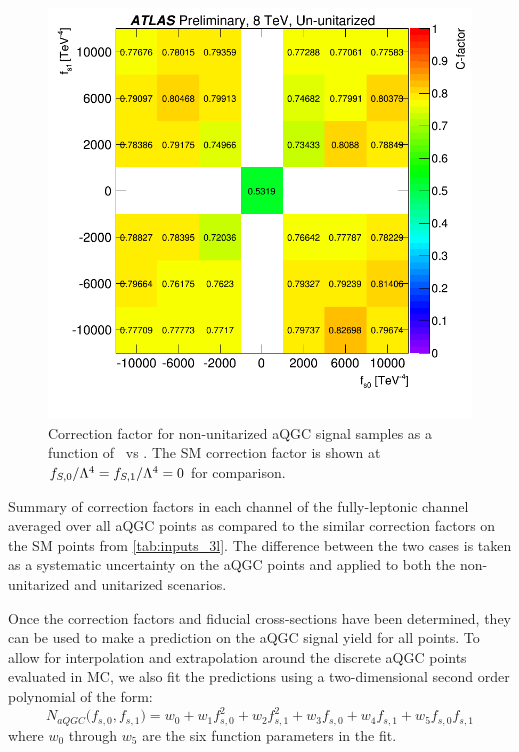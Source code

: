 \begin{figure}[htb]
\centering
\includegraphics[width=.8\textwidth]{figures/aQGC/cfactor_chargesum.png}
\caption{Correction factor for non-unitarized aQGC signal samples as a function of \fszero~vs \fsone.
The SM correction factor is shown at $f_{S,0}/\Lambda^4=f_{S,1}/\Lambda^4=0$ for comparison.}
\label{fig:aqgc_cfactor_3l}
\end{figure}


\begin{table}[htb]
\centering

\caption{Summary of correction factors in each channel of the fully-leptonic channel 
averaged over all aQGC points as compared to the similar correction factors on the SM 
points from \tab\ref{tab:inputs_3l}. The difference between the two cases
is taken as a systematic uncertainty on the aQGC points and applied to both the 
non-unitarized and unitarized scenarios.}
\label{tab:aqgc_cfactor_3l_summary}
\end{table}

Once the correction factors and fiducial cross-sections have been determined,
they can be used to make a prediction on the aQGC signal yield 
for all points.  To allow for interpolation and extrapolation
around the discrete aQGC points evaluated in MC, we also 
fit the predictions using a two-dimensional second order polynomial of 
the form:
\begin{equation}
N_{aQGC}\big(f_{s,0},f_{s,1}\big) = w_0 + w_1 f_{s,0}^2 + w_2 f_{s,1}^2
+ w_3 f_{s,0} + w_4  f_{s,1} + w_5 f_{s,0} f_{s,1}
\end{equation}
where $w_0$ through $w_5$ are the six function parameters in the fit.


